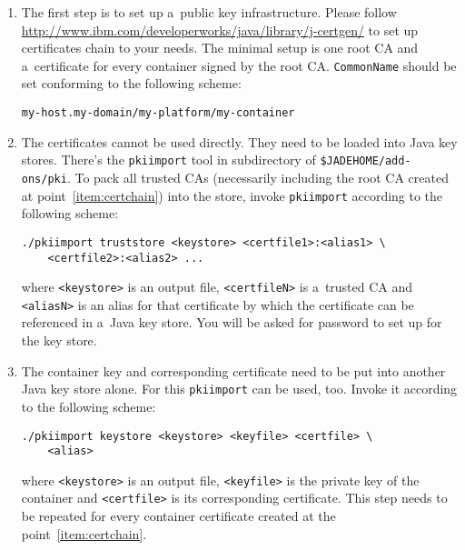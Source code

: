 \documentclass[a4paper,11pt]{article}
\begin{document}
\begin{enumerate}

  \item The first step is to set up a~public key infrastructure.  Please follow
    \url{http://www.ibm.com/developerworks/java/library/j-certgen/} to set up
    certificates chain to your needs.  The minimal setup is one root CA and
    a~certificate for every container signed by the root CA.
    \texttt{CommonName} should be set conforming to the following scheme:

\begin{verbatim}
my-host.my-domain/my-platform/my-container
\end{verbatim}
    \label{item:certchain}

  \item The certificates cannot be used directly.  They need to be loaded into
    Java key stores.  There's the \texttt{pkiimport} tool in 
    subdirectory of \texttt{\$JADEHOME/add-ons/pki}.  To pack all trusted CAs
    (necessarily including the root CA created at point~\ref{item:certchain})
    into the store, invoke \texttt{pkiimport} according to the following scheme:

\begin{verbatim}
./pkiimport truststore <keystore> <certfile1>:<alias1> \
    <certfile2>:<alias2> ...
\end{verbatim}

    where \texttt{<keystore>} is an output file, \texttt{<certfileN>} is
    a~trusted CA and \texttt{<aliasN>} is an alias for that certificate by
    which the certificate can be referenced in a~Java key store.  You will be
    asked for password to set up for the key store.

  \item The container key and corresponding certificate need to be put into
    another Java key store alone.  For this \texttt{pkiimport} can be used,
    too.  Invoke it according to the following scheme:

\begin{verbatim}
./pkiimport keystore <keystore> <keyfile> <certfile> \
    <alias>
\end{verbatim}

    where \texttt{<keystore>} is an output file, \texttt{<keyfile>} is the
    private key of the container and \texttt{<certfile>} is its corresponding
    certificate.  This step needs to be repeated for every container
    certificate created at the point~\ref{item:certchain}.

\end{enumerate}
\end{document}
